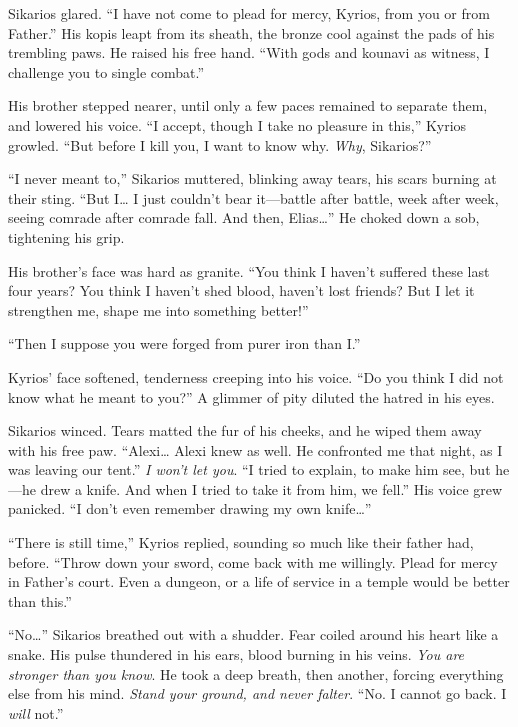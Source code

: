 Sikarios glared. ``I have not come to plead for mercy, Kyrios, from you or from Father.'' His kopis leapt from its sheath, the bronze cool against the pads of his trembling paws. He raised his free hand. ``With gods and kounavi as witness, I challenge you to single combat.''

His brother stepped nearer, until only a few paces remained to separate them, and lowered his voice. ``I accept, though I take no pleasure in this,'' Kyrios growled. ``But before I kill you, I want to know why. \emph{Why}, Sikarios?''

``I never meant to,'' Sikarios muttered, blinking away tears, his scars burning at their sting. ``But I\ldots{} I just couldn't bear it---battle after battle, week after week, seeing comrade after comrade fall. And then, Elias\ldots'' He choked down a sob, tightening his grip.

His brother's face was hard as granite. ``You think I haven't suffered these last four years? You think I haven't shed blood, haven't lost friends? But I let it strengthen me, shape me into something better!''

``Then I suppose you were forged from purer iron than I.''

Kyrios' face softened, tenderness creeping into his voice. ``Do you think I did not know what he meant to you?'' A glimmer of pity diluted the hatred in his eyes.

Sikarios winced. Tears matted the fur of his cheeks, and he wiped them away with his free paw. ``Alexi\ldots{} Alexi knew as well. He confronted me that night, as I was leaving our tent.'' \emph{I won't let you}. ``I tried to explain, to make him see, but he---he drew a knife. And when I tried to take it from him, we fell.'' His voice grew panicked. ``I don't even remember drawing my own knife\ldots''

``There is still time,'' Kyrios replied, sounding so much like their father had, before. ``Throw down your sword, come back with me willingly. Plead for mercy in Father's court. Even a dungeon, or a life of service in a temple would be better than this.''

``No\ldots'' Sikarios breathed out with a shudder. Fear coiled around his heart like a snake. His pulse thundered in his ears, blood burning in his veins. \emph{You are stronger than you know}. He took a deep breath, then another, forcing everything else from his mind. \emph{Stand your ground, and never falter}. ``No. I cannot go back. I \emph{will} not.''

